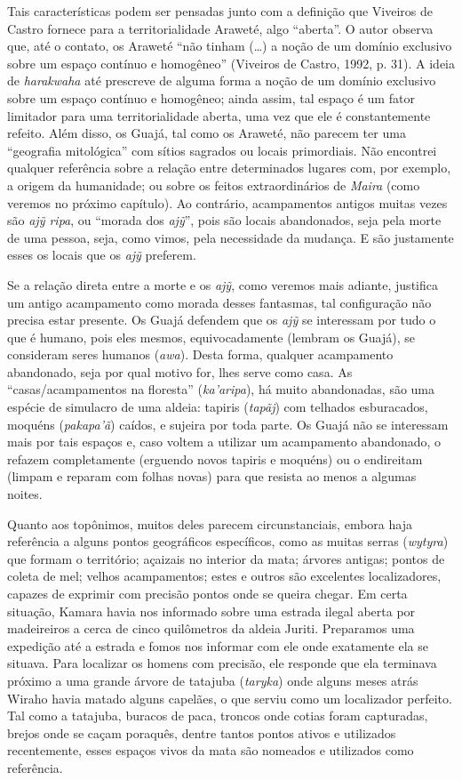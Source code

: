 Tais características podem ser pensadas junto com a definição que
Viveiros de Castro fornece para a territorialidade Araweté, algo
``aberta''. O autor observa que, até o contato, os Araweté ``não tinham
(\ldots{}) a noção de um domínio exclusivo sobre um espaço contínuo e
homogêneo'' (Viveiros de Castro, 1992, p. 31). A ideia de
\emph{harakwaha} até prescreve de alguma forma a noção de um domínio
exclusivo sobre um espaço contínuo e homogêneo; ainda assim, tal espaço
é um fator limitador para uma territorialidade aberta, uma vez que ele é
constantemente refeito. Além disso, os Guajá, tal como os Araweté, não
parecem ter uma ``geografia mitológica'' com sítios sagrados ou locais
primordiais. Não encontrei qualquer referência sobre a relação entre
determinados lugares com, por exemplo, a origem da humanidade; ou sobre
os feitos extraordinários de \emph{Maira} (como veremos no próximo
capítulo). Ao contrário, acampamentos antigos muitas vezes são \emph{ajỹ
ripa}, ou ``morada dos \emph{ajỹ}'', pois são locais abandonados, seja
pela morte de uma pessoa, seja, como vimos, pela necessidade da mudança.
E são justamente esses os locais que os \emph{ajỹ} preferem.

Se a relação direta entre a morte e os \emph{ajỹ}, como veremos mais
adiante, justifica um antigo acampamento como morada desses fantasmas,
tal configuração não precisa estar presente. Os Guajá defendem que os
\emph{ajỹ} se interessam por tudo o que é humano, pois eles mesmos,
equivocadamente (lembram os Guajá), se consideram seres humanos
(\emph{awa}). Desta forma, qualquer acampamento abandonado, seja por
qual motivo for, lhes serve como casa. As ``casas/acampamentos na
floresta'' (\emph{ka'aripa}), há muito abandonadas, são uma espécie de
simulacro de uma aldeia: tapiris (\emph{tapãj}) com telhados
esburacados, moquéns (\emph{pakapa'ã}) caídos, e sujeira por toda parte.
Os Guajá não se interessam mais por tais espaços e, caso voltem a
utilizar um acampamento abandonado, o refazem completamente (erguendo
novos tapiris e moquéns) ou o endireitam (limpam e reparam com folhas
novas) para que resista ao menos a algumas noites.

Quanto aos topônimos, muitos deles parecem circunstanciais, embora haja
referência a alguns pontos geográficos específicos, como as muitas
serras (\emph{wytyra}) que formam o território; açaizais no interior da
mata; árvores antigas; pontos de coleta de mel; velhos acampamentos;
estes e outros são excelentes localizadores, capazes de exprimir com
precisão pontos onde se queira chegar. Em certa situação, Kamara havia
nos informado sobre uma estrada ilegal aberta por madeireiros a cerca de
cinco quilômetros da aldeia Juriti. Preparamos uma expedição até a
estrada e fomos nos informar com ele onde exatamente ela se situava.
Para localizar os homens com precisão, ele responde que ela terminava
próximo a uma grande árvore de tatajuba (\emph{taryka}) onde alguns
meses atrás Wiraho havia matado alguns capelães, o que serviu como um
localizador perfeito. Tal como a tatajuba, buracos de paca, troncos onde
cotias foram capturadas, brejos onde se caçam poraquês, dentre tantos
pontos ativos e utilizados recentemente, esses espaços vivos da mata são
nomeados e utilizados como referência.

